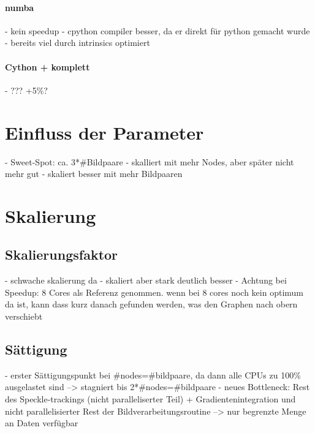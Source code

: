\paragraph{numba}

\begin{correctmore}
	- kein speedup
	- cpython compiler besser, da er direkt für python gemacht wurde
	- bereits viel durch intrinsics optimiert
\end{correctmore}

\paragraph{Cython + komplett}

\begin{correctmore}
	- ??? +5\%?
\end{correctmore}

\section{Einfluss der Parameter}

\begin{correctmore}
	- Sweet-Spot: ca. 3*\#Bildpaare
	- skalliert mit mehr Nodes, aber später nicht mehr gut
	- skaliert besser mit mehr Bildpaaren
\end{correctmore}

\section{Skalierung}

\subsection{Skalierungsfaktor}

\begin{correctme}
	- schwache skalierung da
	- skaliert aber stark deutlich besser
	- Achtung bei Speedup: 8 Cores als Referenz genommen. wenn bei 8 cores noch kein optimum da ist, kann dass kurz danach gefunden werden, was den Graphen nach obern verschiebt
\end{correctme}

\subsection{Sättigung}

\begin{correctmore}
	- erster Sättigungspunkt bei \#nodes=\#bildpaare, da dann alle CPUs zu 100\% ausgelastet sind --> stagniert bis 2*\#nodes=\#bildpaare
	- neues Bottleneck: Rest des Speckle-trackings (nicht paralleliserter Teil) + Gradientenintegration und nicht parallelisierter Rest der Bildverarbeitungsroutine
	--> nur begrenzte Menge an Daten verfügbar
\end{correctmore}